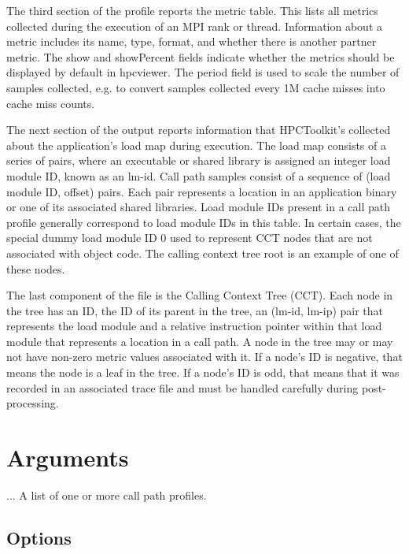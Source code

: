 \documentclass[english]{article}
\begin{document}
The third section of the profile reports the metric table.  This lists
all metrics collected during the execution of an MPI rank or thread.
Information about a metric includes its name, type, format, and whether
there is another partner metric.  The show and showPercent fields
indicate whether the metrics should be displayed by default in hpcviewer.
The period field is used to scale the number of samples collected, e.g. to
convert samples collected every 1M cache misses into cache miss counts.

The next section of the output reports information that HPCToolkit's
collected about the application's load map during execution.  The load
map consists of a series of pairs, where an executable or shared
library is assigned an integer load module ID, known as an lm-id.
Call path samples consist of a sequence of (load module ID, offset)
pairs. Each pair represents a location in an application binary or one
of its associated shared libraries. Load module IDs present in a call
path profile generally correspond to load module IDs in this table. In
certain cases, the special dummy load module ID 0 used to represent CCT
nodes that are not associated with object code. The calling context tree
root is an example of one of these nodes.

The last component of the file is the Calling Context Tree (CCT). Each
node in the tree has an ID, the ID of its parent in the tree, an
(lm-id, lm-ip) pair that represents the load module and a relative
instruction pointer within that load module that represents a location
in a call path.  A node in the tree may or may not have non-zero metric
values associated with it. If a node's ID is negative, that means the
node is a leaf in the tree. If a node's ID is odd, that means that it
was recorded in an associated trace file and must be handled carefully
during post-processing.

\section{Arguments}

\begin{Description}
\item[\Arg{profile-file} ...] A list of one or more call path profiles.
\end{Description}

\subsection{Options}
\end{document}
